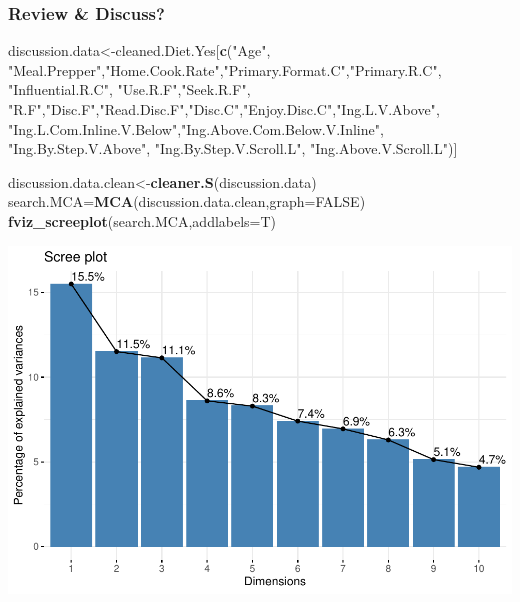 \documentclass[
]{article}
\newenvironment{Shaded}{\begin{snugshade}}{\end{snugshade}}
\newcommand{\DataTypeTok}[1]{\textcolor[rgb]{0.13,0.29,0.53}{#1}}
\newcommand{\KeywordTok}[1]{\textcolor[rgb]{0.13,0.29,0.53}{\textbf{#1}}}
\newcommand{\NormalTok}[1]{#1}
\newcommand{\OtherTok}[1]{\textcolor[rgb]{0.56,0.35,0.01}{#1}}
\newcommand{\StringTok}[1]{\textcolor[rgb]{0.31,0.60,0.02}{#1}}
\begin{document}
\hypertarget{review-discuss-1}{%
\subsubsection{Review \& Discuss?}\label{review-discuss-1}}

\begin{Shaded}
\begin{Highlighting}[]
\NormalTok{discussion.data<-cleaned.Diet.Yes[}\KeywordTok{c}\NormalTok{(}\StringTok{"Age"}\NormalTok{, }\StringTok{"Meal.Prepper"}\NormalTok{,}\StringTok{"Home.Cook.Rate"}\NormalTok{,}\StringTok{"Primary.Format.C"}\NormalTok{,}\StringTok{"Primary.R.C"}\NormalTok{, }\StringTok{"Influential.R.C"}\NormalTok{, }
            \StringTok{"Use.R.F"}\NormalTok{,}\StringTok{"Seek.R.F"}\NormalTok{, }\StringTok{"R.F"}\NormalTok{,}\StringTok{"Disc.F"}\NormalTok{,}\StringTok{"Read.Disc.F"}\NormalTok{,}\StringTok{"Disc.C"}\NormalTok{,}\StringTok{"Enjoy.Disc.C"}\NormalTok{,}\StringTok{"Ing.L.V.Above"}\NormalTok{,}
            \StringTok{"Ing.L.Com.Inline.V.Below"}\NormalTok{,}\StringTok{"Ing.Above.Com.Below.V.Inline"}\NormalTok{,  }\StringTok{"Ing.By.Step.V.Above"}\NormalTok{,  }\StringTok{"Ing.By.Step.V.Scroll.L"}\NormalTok{,}
            \StringTok{"Ing.Above.V.Scroll.L"}\NormalTok{)]}

\NormalTok{discussion.data.clean<-}\KeywordTok{cleaner.S}\NormalTok{(discussion.data)}
\NormalTok{search.MCA=}\KeywordTok{MCA}\NormalTok{(discussion.data.clean,}\DataTypeTok{graph=}\OtherTok{FALSE}\NormalTok{)}
\KeywordTok{fviz_screeplot}\NormalTok{(search.MCA,}\DataTypeTok{addlabels=}\NormalTok{T)}
\end{Highlighting}
\end{Shaded}

\includegraphics{Average-User-MCA_files/figure-latex/diet yes social-1.pdf}
\end{document}
